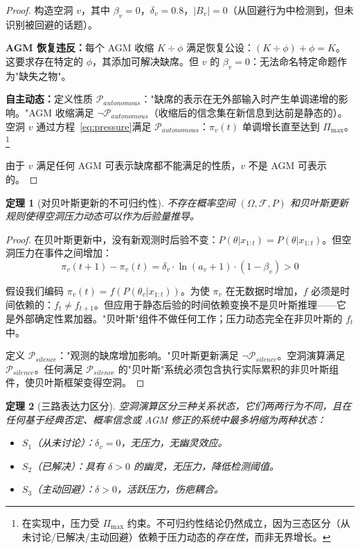 \documentclass[11pt]{article}
\newtheorem{theorem}{定理}[section]
\begin{document}
\begin{proof}
构造空洞 $v$，其中 $\beta_v = 0$，$\delta_v = 0.8$，$|B_v| = 0$（从回避行为中检测到，但未识别被回避的话题）。

\textbf{AGM 恢复违反：}每个 AGM 收缩 $K \div \phi$ 满足恢复公设：$(K \div \phi) + \phi = K$。这要求存在特定的 $\phi$，其添加可解决缺席。但 $v$ 的 $\beta_v = 0$：无法命名特定命题作为"缺失之物"。

\textbf{自主动态：}定义性质 $\mathcal{P}_{autonomous}$："缺席的表示在无外部输入时产生单调递增的影响。"AGM 收缩满足 $\neg\mathcal{P}_{autonomous}$（收缩后的信念集在新信息到达前是静态的）。空洞 $v$ 通过方程~\eqref{eq:pressure}满足 $\mathcal{P}_{autonomous}$：$\pi_v(t)$ 单调增长直至达到 $\Pi_{\max}$。\footnote{在实现中，压力受 $\Pi_{\max}$ 约束。不可归约性结论仍然成立，因为三态区分（从未讨论/已解决/主动回避）依赖于压力动态的\emph{存在性}，而非无界增长。}

由于 $v$ 满足任何 AGM 可表示缺席都不能满足的性质，$v$ 不是 AGM 可表示的。
\end{proof}

\begin{theorem}[对贝叶斯更新的不可归约性]
\label{thm:void-bayes}
不存在概率空间 $(\Omega, \mathcal{F}, P)$ 和贝叶斯更新规则使得空洞压力动态可以作为后验量推导。
\end{theorem}

\begin{proof}
在贝叶斯更新中，没有新观测时后验不变：$P(\theta | x_{1:t}) = P(\theta | x_{1:t})$。但空洞压力在事件之间增加：
\begin{equation}
\pi_v(t+1) - \pi_v(t) = \delta_v \cdot \ln(a_v + 1) \cdot (1 - \beta_v) > 0
\end{equation}

假设我们编码 $\pi_v(t) = f(P(\theta_v | x_{1:t}))$。为使 $\pi_v$ 在无数据时增加，$f$ 必须是时间依赖的：$f_t \neq f_{t+1}$。但应用于静态后验的时间依赖变换不是贝叶斯推理——它是外部确定性累加器。"贝叶斯"组件不做任何工作；压力动态完全在非贝叶斯的 $f_t$ 中。

定义 $\mathcal{P}_{silence}$："观测的缺席增加影响。"贝叶斯更新满足 $\neg\mathcal{P}_{silence}$。空洞演算满足 $\mathcal{P}_{silence}$。任何满足 $\mathcal{P}_{silence}$ 的"贝叶斯"系统必须包含执行实际累积的非贝叶斯组件，使贝叶斯框架变得空洞。
\end{proof}

\begin{theorem}[三路表达力区分]
\label{thm:void-three-way}
空洞演算区分三种关系状态，它们两两行为不同，且在任何基于经典否定、概率信念或 AGM 修正的系统中最多坍缩为两种状态：
\begin{itemize}
\item $S_1$（从未讨论）：$\delta_v = 0$，无压力，无幽灵效应。
\item $S_2$（已解决）：具有 $\delta > 0$ 的幽灵，无压力，降低检测阈值。
\item $S_3$（主动回避）：$\delta > 0$，活跃压力，伤疤耦合。
\end{itemize}
\end{theorem}
\end{document}
